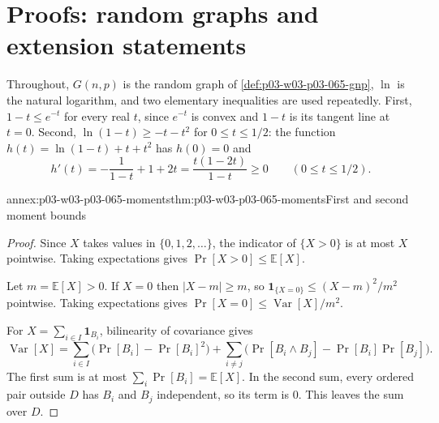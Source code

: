 \section{Proofs: random graphs and extension statements}
\label{sec:annex-p03-w03-p03-065-random-graphs}

Throughout, \(G(n,p)\) is the random graph of
\cref{def:p03-w03-p03-065-gnp}, \(\ln\) is the natural logarithm, and two
elementary inequalities are used repeatedly.  First, \(1-t\leq e^{-t}\) for
every real \(t\), since \(e^{-t}\) is convex and \(1-t\) is its tangent line
at \(t=0\).  Second, \(\ln(1-t)\geq-t-t^2\) for \(0\leq t\leq1/2\): the
function \(h(t)=\ln(1-t)+t+t^2\) has \(h(0)=0\) and
\[
  h'(t)=-\frac1{1-t}+1+2t=\frac{t(1-2t)}{1-t}\geq0
  \qquad(0\leq t\leq1/2).
\]

\begin{annexitem}{annex:p03-w03-p03-065-moments}{thm:p03-w03-p03-065-moments}{First and second moment bounds}
\begin{proof}
Since \(X\) takes values in \(\{0,1,2,\ldots\}\), the indicator of
\(\{X>0\}\) is at most \(X\) pointwise.  Taking expectations gives
\(\Pr[X>0]\leq\mathbb E[X]\).

Let \(m=\mathbb E[X]>0\).  If \(X=0\) then \(|X-m|\geq m\), so
\(\mathbf 1_{\{X=0\}}\leq(X-m)^2/m^2\) pointwise.  Taking expectations gives
\(\Pr[X=0]\leq\operatorname{Var}[X]/m^2\).

For \(X=\sum_{i\in I}\mathbf 1_{B_i}\), bilinearity of covariance gives
\[
  \operatorname{Var}[X]=\sum_{i\in I}\bigl(\Pr[B_i]-\Pr[B_i]^2\bigr)
  +\sum_{i\neq j}\bigl(\Pr[B_i\wedge B_j]-\Pr[B_i]\Pr[B_j]\bigr).
\]
The first sum is at most \(\sum_i\Pr[B_i]=\mathbb E[X]\).  In the second
sum, every ordered pair outside \(D\) has \(B_i\) and \(B_j\) independent, so
its term is \(0\).  This leaves the sum over \(D\).
\end{proof}
\end{annexitem}

